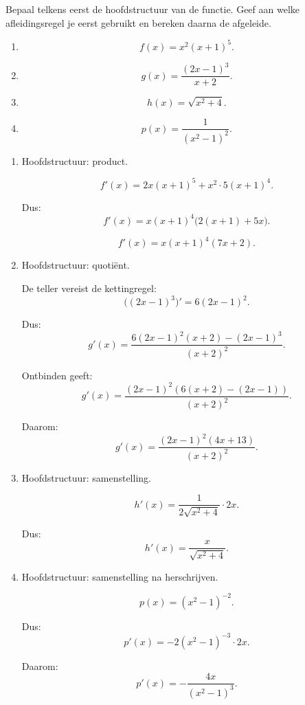 \documentclass{ximera}
\begin{document}
\begin{oefening}{\oefU\ESS}

Bepaal telkens eerst de hoofdstructuur van de functie.
Geef aan welke afleidingsregel je eerst gebruikt en bereken daarna
de afgeleide.

\begin{enumerate}
  \item \[f(x)=x^2(x+1)^5.\]
  \item \[g(x)=\frac{(2x-1)^3}{x+2}.\]
  \item \[h(x)=\sqrt{x^2+4}.\]
  \item \[p(x)=\frac{1}{(x^2-1)^2}.\]
\end{enumerate}

\begin{oplossing}
\begin{enumerate}
  \item Hoofdstructuur: product.

  \[
  f'(x)
  =
  2x(x+1)^5
  +
  x^2\cdot5(x+1)^4.
  \]

  Dus:
  \[
  f'(x)
  =
  x(x+1)^4\bigl(2(x+1)+5x\bigr).
  \]

  \[\boxed{f'(x)=x(x+1)^4(7x+2).}\]

  \item Hoofdstructuur: quotiënt.

  De teller vereist de kettingregel:
  \[
  \bigl((2x-1)^3\bigr)'=6(2x-1)^2.
  \]

  Dus:
  \[
  g'(x)
  =
  \frac{6(2x-1)^2(x+2)-(2x-1)^3}{(x+2)^2}.
  \]

  Ontbinden geeft:
  \[
  g'(x)
  =
  \frac{(2x-1)^2\left(6(x+2)-(2x-1)\right)}
       {(x+2)^2}.
  \]

  Daarom:
  \[\boxed{g'(x)=\frac{(2x-1)^2(4x+13)}{(x+2)^2}.}\]

  \item Hoofdstructuur: samenstelling.

  \[
  h'(x)
  =
  \frac{1}{2\sqrt{x^2+4}}\cdot2x.
  \]

  Dus:
  \[\boxed{h'(x)=\frac{x}{\sqrt{x^2+4}}.}\]

  \item Hoofdstructuur: samenstelling na herschrijven.

  \[
  p(x)=(x^2-1)^{-2}.
  \]

  Dus:
  \[
  p'(x)
  =
  -2(x^2-1)^{-3}\cdot2x.
  \]

  Daarom:
  \[\boxed{p'(x)=-\frac{4x}{(x^2-1)^3}.}\]
\end{enumerate}
\end{oplossing}
\end{oefening}
\end{document}
